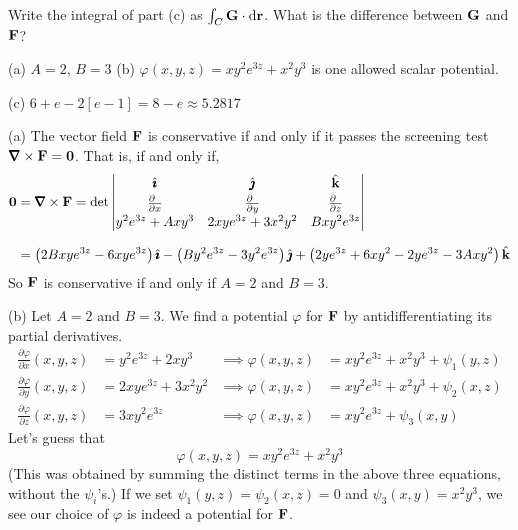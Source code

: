 \begin{hint} 
	Write the integral of part (c) as $\int_C\mathbf{G}\cdot\mathrm{d}\mathbf{r}$.
	What is the difference between $\mathbf{G}$ and $\mathbf{F}$?
\end{hint}




\begin{answer}
	(a) $A=2$, $B=3$ \qquad
	(b) $\varphi(x,y,z)=xy^2e^{3z}+x^2y^3$ is one allowed scalar potential.
	
	(c) $6+e-2[e-1]=8-e\approx5.2817$
\end{answer}


\begin{solution} 
(a)
The vector field $\mathbf{F}$ is conservative if and only if it passes 
the screening test $\vnabla\times\vF=\vZero$. That is, if and only if,
\begin{align*}
\vZero &= \vnabla\times\vF=\det\left|\begin{matrix}\hi&\hj&\hk\\[0.03in] \frac{\partial\hfill}{\partial x}&
        \frac{\partial\hfill}{\partial y}&
        \frac{\partial\hfill}{\partial z}\\[0.03in]
y^2 e^{3z} +Axy^3 & 2xye^{3z}+3x^2y^2 & Bxy^2e^{3z}\end{matrix}\right| \\[0.1in]
&=\big(2Bxy e^{3z}-6xy e^{3z}\big)\,\hi
   -\big(By^2 e^{3z}-3y^2e^{3z}\big)\,\hj
   +\big(2ye^{3z}+6xy^2- 2ye^{3z}-3Axy^2\big)\,\hk
\end{align*}
So $\mathbf{F}$ is conservative if and only if $A=2$ and $B=3$.

(b) Let $A=2$ and $B=3$. We find a potential $\varphi$ for $\mathbf{F}$ by antidifferentiating its partial derivatives.
\begin{align*}
\frac{\partial \varphi}{\partial x}(x,y,z) 
            &= y^2 e^{3z} +2xy^3 &\implies \varphi(x,y,z)&=xy^2e^{3z}+x^2y^3+\psi_1(y,z)\\
\frac{\partial \varphi}{\partial y}(x,y,z) &= 2xye^{3z}+3x^2y^2 &\implies \varphi(x,y,z)&=xy^2e^{3z}+x^2y^3+\psi_2(x,z)\\
\frac{\partial \varphi}{\partial z}(x,y,z) &= 3xy^2e^{3z}&\implies \varphi(x,y,z)&=xy^2e^{3z}+\psi_3(x,y)
\end{align*}
Let's guess that 
\[\varphi(x,y,z)=xy^2e^{3z}+x^2y^3\]
(This was obtained by summing the distinct terms in the above three equations, without the $\psi_i$'s.) If we set $\psi_1(y,z)=\psi_2(x,z)=0$ and $\psi_3(x,y)=x^2y^3$, we see our choice of $\varphi$ is indeed a potential for $\mathbf{F}$.



\end{solution}
